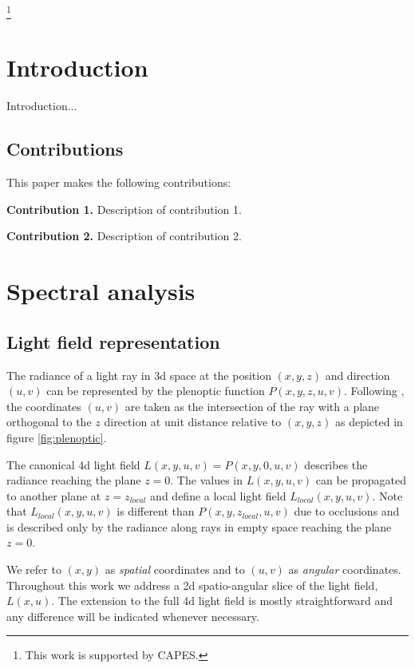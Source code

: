 \documentclass[acmtog,review,anonymous]{acmart}
\begin{document}
\thanks{This work is supported by CAPES.}

\maketitle

\section{Introduction}

Introduction...

\subsection{Contributions}

This paper makes the following contributions:

\textbf{Contribution 1.} Description of contribution 1.

\textbf{Contribution 2.} Description of contribution 2.

\section{Spectral analysis}

\subsection{Light field representation}

The radiance of a light ray in 3d space at the position $(x, y, z)$ and direction $(u, v)$ can be represented by the plenoptic function $P(x, y, z, u, v)$. Following \cite{Chai:2000:PS:344779.344932}, the coordinates $(u, v)$ are taken as the intersection of the ray with a plane orthogonal to the $z$ direction at unit distance relative to $(x, y, z)$ as depicted in figure \ref{fig:plenoptic}.

The canonical 4d light field $L(x, y, u, v) = P(x, y, 0, u, v)$ describes the radiance reaching the plane $z = 0$. The values in $L(x, y, u, v)$ can be propagated to another plane at $z = z_{local}$ and define a local light field $L_{local}(x, y, u, v)$. Note that $L_{local}(x, y, u, v)$ is different than $P(x, y, z_{local}, u, v)$ due to occlusions and is described only by the radiance along rays in empty space reaching the plane $z = 0$.

We refer to $(x, y)$ as \emph{spatial} coordinates and to $(u, v)$ as \emph{angular} coordinates. Throughout this work we address a 2d spatio-angular slice of the light field, $L(x, u)$. The extension to the full 4d light field is mostly straightforward and any difference will be indicated whenever necessary.
\end{document}
